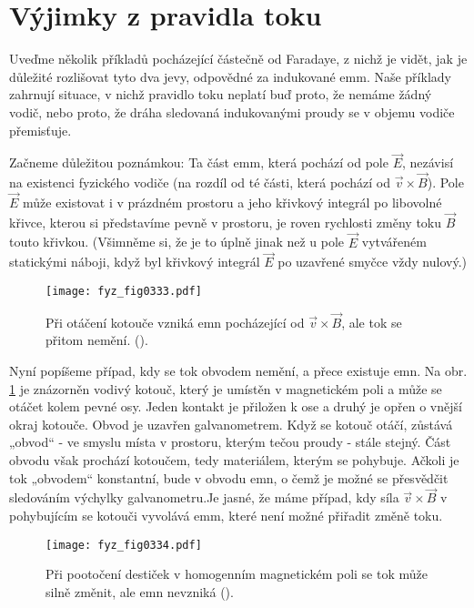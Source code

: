 \section{Výjimky z pravidla toku}\label{fyz:IIchapXVIIsecII}
  Uveďme několik příkladů pocházející částečně od Faradaye, z nichž je vidět, jak je důležité 
  rozlišovat tyto dva jevy, odpovědné za indukované emm. Naše příklady zahrnují situace, v nichž 
  pravidlo toku neplatí buď proto, že nemáme žádný vodič, nebo proto, že dráha sledovaná 
  indukovanými proudy se v objemu vodiče přemisťuje.

  Začneme důležitou poznámkou: Ta část emm, která pochází od pole \(\vec{E}\), nezávisí na 
  existenci fyzického vodiče (na rozdíl od té části, která pochází od \(\vec{v}\times\vec{B}\)). 
  Pole \(\vec{E}\) může existovat i v prázdném prostoru a jeho křivkový integrál po libovolné 
  křivce, kterou si představíme pevně v prostoru, je roven rychlosti změny toku \(\vec{B}\) touto 
  křivkou. (Všimněme si, že je to úplně jinak než u pole \(\vec{E}\) vytvářeném statickými náboji, 
  když byl křivkový integrál \(\vec{E}\) po uzavřené smyčce vždy nulový.)

  \begin{figure}[ht!]  %
    \centering
    \texttt{[image: fyz\_fig0333.pdf]}
    \caption{Při otáčení kotouče vzniká emn pocházející od \(\vec{v}\times\vec{B}\), ale tok se 
             přitom nemění.
             (\cite[s.~296]{Feynman02}).}
    \label{fyz:fig0333}
  \end{figure}
  
  Nyní popíšeme případ, kdy se tok obvodem nemění, a přece existuje emn. Na obr. \ref{fyz:fig0333} 
  je znázorněn vodivý kotouč, který je umístěn v magnetickém poli a může se otáčet kolem pevné osy. 
  Jeden kontakt je přiložen k ose a druhý je opřen o vnější okraj kotouče. Obvod je uzavřen 
  galvanometrem. Když se kotouč otáčí, zůstává „obvod“ - ve smyslu místa v prostoru, kterým tečou 
  proudy - stále stejný. Část obvodu však prochází kotoučem, tedy materiálem, kterým se pohybuje. 
  Ačkoli je tok „obvodem“ konstantní, bude v obvodu emn, o čemž je možné se přesvědčit sledováním 
  výchylky galvanometru.Je jasné, že máme případ, kdy síla \(\vec{v}\times\vec{B}\) v pohybujícím 
  se kotouči vyvolává emm, které není možné přiřadit změně toku.
  
  \begin{figure}[ht!]  %
    \centering
    \texttt{[image: fyz\_fig0334.pdf]}
    \caption{Při pootočení destiček v homogenním magnetickém poli se tok může silně změnit, ale emn
             nevzniká
             (\cite[s.~296]{Feynman02}).}
    \label{fyz:fig0334}
  \end{figure}
  
